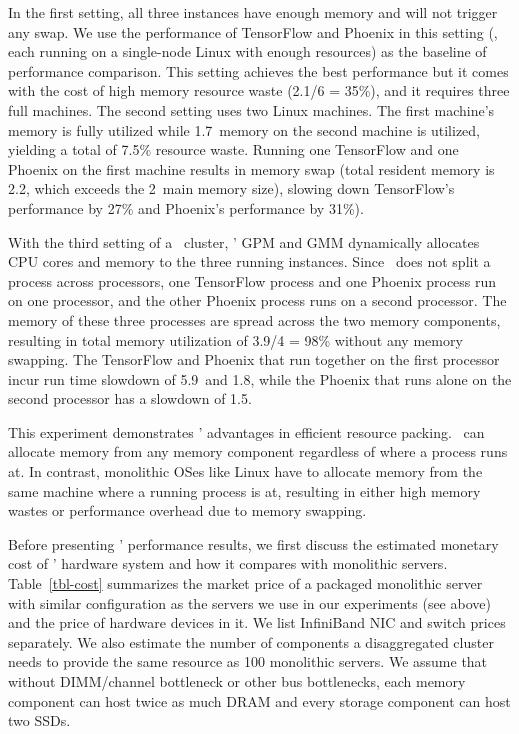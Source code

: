 \documentclass[10pt,times,twocolumn]{z2-article}
\begin{document}
{{{{{{{In the first setting, all three instances have enough memory and will not trigger any swap. 
We use the performance of TensorFlow and Phoenix in this setting (\ie, each running on a single-node Linux with enough resources)
as the baseline of performance comparison.
This setting achieves the best performance but it comes with the cost of high memory resource waste (2.1/6 = 35\%),
and it requires three full machines.
The second setting uses two Linux machines. 
The first machine's memory is fully utilized while 1.7\GB\ memory on the second machine is utilized, yielding a total of 7.5\% resource waste.
Running one TensorFlow and one Phoenix on the first machine results in memory swap (total resident memory is 2.2\GB, which exceeds the 2\GB\ main memory size),
slowing down TensorFlow's performance by 27\% and Phoenix's performance by 31\%).

With the third setting of a \lego\ cluster, \lego{}' GPM and GMM dynamically allocates CPU cores and memory to 
the three running instances. 
Since \lego\ does not split a process across processors, one TensorFlow process and one Phoenix process
run on one processor, and the other Phoenix process runs on a second processor.
The memory of these three processes are spread across the two memory components,
resulting in total memory utilization of 3.9/4 = 98\% without any memory swapping.
The TensorFlow and Phoenix that run together on the first processor incur run time slowdown of 
5.9\x\ and 1.8\x, while the Phoenix that runs alone on the second processor has a slowdown of 1.5\x.

This experiment demonstrates \lego{}' advantages in efficient resource packing.
\lego\ can allocate memory from any memory component regardless of where a process runs at.
In contrast, monolithic OSes like Linux have to allocate memory from the same machine where
a running process is at, resulting in either high memory wastes or performance overhead due to memory swapping.

Before presenting \lego{}' performance results, we first discuss the estimated monetary cost of 
\lego{}' hardware system and how it compares with monolithic servers.
Table~\ref{tbl-cost} summarizes the market price of a packaged monolithic server 
with similar configuration as the servers we use in our experiments (see above)
and the price of hardware devices in it. 
We list InfiniBand NIC and switch prices separately.
We also estimate the number of components a disaggregated cluster needs to provide the same 
resource as 100 monolithic servers.
We assume that without DIMM/channel bottleneck or other bus bottlenecks, 
each memory component can host twice as much DRAM and every storage component can host two SSDs.

}}}}}}}
\end{document}

